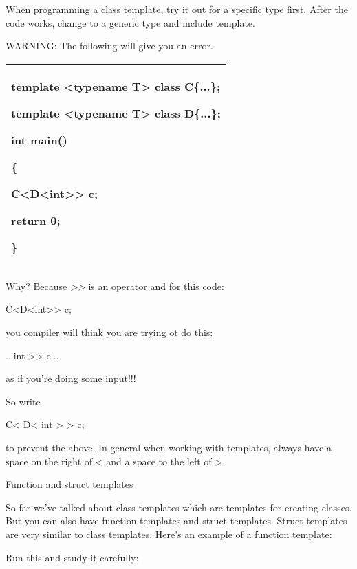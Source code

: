 \documentclass[
]{article}
\begin{document}
When programming a class template, try it out for a specific type first.
After the code works, change to a generic type and include template.

WARNING: The following will give you an error.

\begin{longtable}[]{@{}l@{}}
\toprule
\endhead
\begin{minipage}[t]{0.97\columnwidth}\raggedright
template \textless typename T\textgreater{} class C\{...\};

template \textless typename T\textgreater{} class D\{...\};

int main()

\{

C\textless D\textless int\textgreater\textgreater{} c;

return 0;

\}\strut
\end{minipage}\tabularnewline
\bottomrule
\end{longtable}

Why? Because \emph{\textgreater\textgreater{}} is an operator and for
this code:

C\textless D\textless int\textgreater\textgreater{} c;

you compiler will think you are trying ot do this:

...int \textgreater\textgreater{} c...

as if you're doing some input!!!

So write

C\textless{} D\textless{} int \textgreater{} \textgreater{} c;

to prevent the above. In general when working with templates, always
have a space on the right of \textless{} and a space to the left of
\textgreater.

Function and struct templates

So far we've talked about class templates which are templates for
creating classes. But you can also have function templates and struct
templates. Struct templates are very similar to class templates. Here's
an example of a function template:

Run this and study it carefully:
\end{document}
